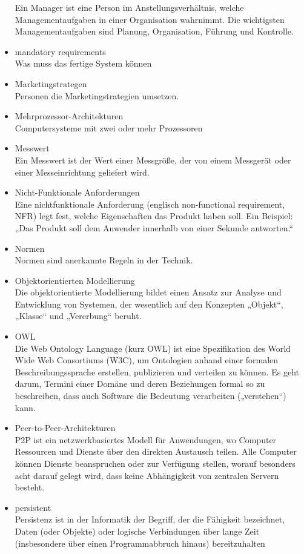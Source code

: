 \begin{itemize}
Ein Manager ist eine Person im Anstellungsverhältnis, welche Managementaufgaben in einer Organisation wahrnimmt. Die wichtigsten Managementaufgaben sind Planung, Organisation, Führung und Kontrolle.
\item 	mandatory requirements\\
Was muss das fertige System können
\item 	Marketingstrategen
\\Personen die Marketingstrategien umsetzen.
\item 	Mehrprozessor-Architekturen\\
Computersysteme mit zwei oder mehr Prozessoren
\item 	Messwert\\Ein Messwert ist der Wert einer Messgröße, der von einem Messgerät oder einer Messeinrichtung geliefert wird.
\item 	Nicht-Funktionale Anforderungen\\
Eine nichtfunktionale Anforderung (englisch non-functional requirement, NFR) legt fest, welche Eigenschaften das Produkt haben soll. Ein Beispiel:
\\
„Das Produkt soll dem Anwender innerhalb von einer Sekunde antworten.“
\item 	Normen\\Normen sind anerkannte Regeln in der Technik. 
\item 	Objektorientierten Modellierung\\Die objektorientierte Modellierung bildet einen Ansatz zur Analyse und Entwicklung von Systemen, der wesentlich auf den Konzepten „Objekt“, „Klasse“ und „Vererbung“ beruht.
\item 	OWL\\
Die Web Ontology Language (kurz OWL) ist eine Spezifikation des World Wide Web Consortiums (W3C), um Ontologien anhand einer formalen Beschreibungssprache erstellen, publizieren und verteilen zu können. Es geht darum, Termini einer Domäne und deren Beziehungen formal so zu beschreiben, dass auch Software die Bedeutung verarbeiten („verstehen“) kann.
\item 	Peer-to-Peer-Architekturen\\
P2P ist ein netzwerkbasiertes Modell für Anwendungen, wo Computer Ressourcen und
Dienste über den direkten Austausch teilen. Alle Computer können Dienste beanspruchen
oder zur Verfügung stellen, worauf besonders acht darauf gelegt wird, dass keine
Abhängigkeit von zentralen Servern besteht.
\item 	persistent\\Persistenz ist in der Informatik der Begriff, der die Fähigkeit bezeichnet, Daten (oder Objekte) oder logische Verbindungen über lange Zeit (insbesondere über einen Programmabbruch hinaus) bereitzuhalten

\end{itemize}
